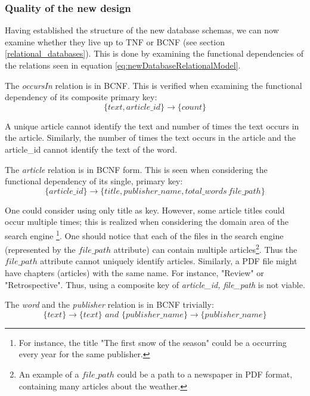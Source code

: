 \subsubsection*{Quality of the new design}
Having established the structure of the new database schemas, we can now examine whether they live up to TNF or BCNF (see section \ref{relational_databases}).
This is done by examining the functional dependencies of the relations seen in equation \ref{eq:newDatabaseRelationalModel}.

The \textit{occursIn} relation is in BCNF. 
This is verified when examining the functional dependency of its composite primary key:
\begin{equation*}
 \{text,article\_id\}\rightarrow \{count\}   
\end{equation*}

A unique article cannot identify the text and number of times the text occurs in the article.
Similarly, the number of times the text occurs in the article and the article\_id cannot identify the text of the word.

The \textit{article} relation is in BCNF form. 
This is seen when considering the functional dependency of its single, primary key:
\begin{equation*}
    \{article\_id\} \rightarrow \{title, publisher\_name,total\_words\, file\_path\}
\end{equation*}

One could consider using only title as key. 
However, some article titles could occur multiple times; this is realized when considering the domain area of the \knox{} search engine
\footnote{For instance, the title "The first snow of the season" could be a occurring every year for the same publisher.}.
One should notice that each of the files in the search engine (represented by the $file\_path$ attribute) can contain multiple articles\footnote{An example of a $file\_path$ could be a path to a newspaper in PDF format, containing many articles about the weather.}.
Thus the $file\_path$ attribute cannot uniquely identify articles.
Similarly, a PDF file might have chapters (articles) with the same name. For instance, "Review" or "Retrospective".
Thus, using a composite key of \textit{article\_id, file\_path} is not viable. 

The \textit{word} and the \textit{publisher} relation is in BCNF trivially:
\begin{equation*}
    \{ text\} \rightarrow \{text\} \textit{\ and\ } \{ publisher\_name \} \rightarrow \{ publisher\_name\}
\end{equation*}

